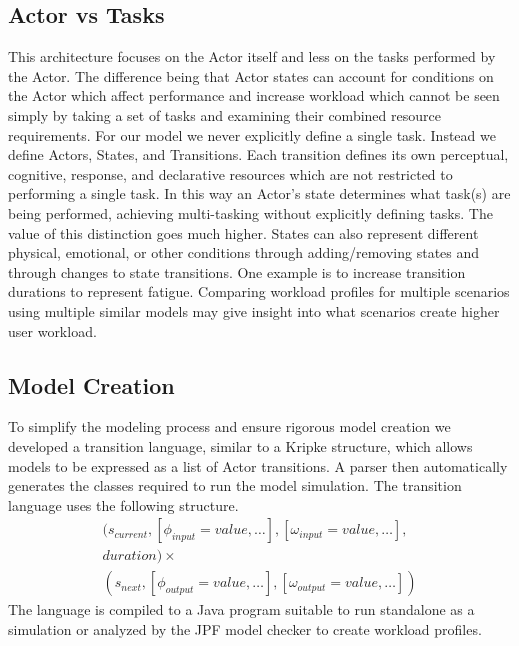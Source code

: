 \subsection{Actor vs Tasks}
This architecture focuses on the Actor itself and less on the tasks performed by
the Actor.  The difference being that Actor states can account for conditions on
the Actor which affect performance and increase workload which cannot be seen
simply by taking a set of tasks and examining their combined resource
requirements.  For our model we never explicitly define a single task.  Instead
we define Actors, States, and Transitions.  Each transition defines its own
perceptual, cognitive, response, and declarative resources \cite{salvucci2008threaded} which are
not restricted to performing a single task.  In this way an Actor's state
determines what task(s) are being performed, achieving multi-tasking without
explicitly defining tasks.  The value of this distinction goes much higher. 
States can also represent different physical, emotional, or other conditions
through adding/removing states and through changes to state transitions. One
example is to increase transition durations to represent fatigue.
Comparing workload profiles for multiple scenarios using multiple
similar models may give insight into what scenarios create higher user workload.

\subsection{Model Creation}
To simplify the modeling process and ensure rigorous model creation we
developed a transition language, similar to a Kripke structure, which allows
models to be expressed as a list of Actor transitions.  A parser then
automatically generates the classes required to run the model simulation.
The transition language uses the following structure.
\begin{equation}
\begin{split}
(s_{current}, [\phi_{input} = value,\ldots], [\omega_{input} = value,\ldots],\\
duration) \times \\
(s_{next}, [\phi_{output} =
value,\ldots], [\omega_{output} = value,\ldots])
\end{split}
\end{equation}
\noindent The language is compiled to a Java program suitable to run standalone
as a simulation or analyzed by the JPF model checker to create
workload profiles.
